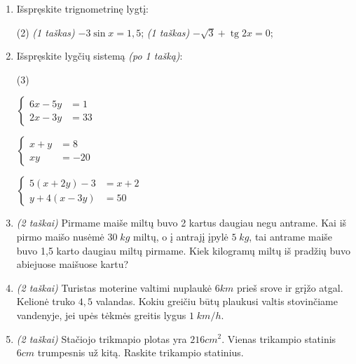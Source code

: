 \documentclass[a4paper]{article}
\DeclareMathOperator{\tg}{tg}
\begin{document}
\begin{enumerate}
      \item Išspręskite trignometrinę lygtį:
            \begin{tasks}[item-format={\normalfont}, after-item-skip=4mm](2)
                  \task \textit{(1 taškas)} $-3\sin{x}=1,5$;
                  \task \textit{(1 taškas)} $-\sqrt{3}+\tg{2x}=0$;
            \end{tasks}

      \item Išspręskite lygčių sistemą \textit{(po 1 tašką)}:
            \begin{tasks}[item-format={\normalfont}, after-item-skip=4mm](3)
                  \task   \par\vspace{-1.3\baselineskip}%
                  $\left\{\begin{aligned}
                              6x - 5y & = 1  \\
                              2x - 3y & = 33
                        \end{aligned}\right.$

                  \task   \par\vspace{-1.3\baselineskip}%
                  $\left\{\begin{aligned}
                              x + y & = 8   \\
                              xy    & = -20
                        \end{aligned}\right.$
                  \task   \par\vspace{-1.3\baselineskip}%
                  $\left\{\begin{aligned}
                              5(x + 2y) -3 & = x+2 \\
                              y+4(x-3y)    & = 50
                        \end{aligned}\right.$
            \end{tasks}
      \item \textit{(2 taškai)} Pirmame maiše miltų buvo 2 kartus daugiau negu antrame. Kai iš pirmo maišo nusėmė $30\; kg$ miltų, o į antrajį įpylė $5\; kg$, tai antrame maiše buvo 1,5 karto daugiau miltų pirmame. Kiek kilogramų miltų iš pradžių buvo abiejuose maišuose kartu?
      \item \textit{(2 taškai)} Turistas moterine valtimi nuplaukė $6 km$ prieš srove ir grįžo atgal. Kelionė truko $4,5$ valandas. Kokiu greičiu būtų plaukusi valtis stovinčiame vandenyje, jei upės tėkmės greitis lygus $1 \; km/h$.
      \item \textit{(2 taškai)} Stačiojo trikmapio plotas yra $216 cm^2$. Vienas trikampio statinis $6 cm$ trumpesnis už kitą. Raskite trikampio statinius.
\end{enumerate}
\end{document}
